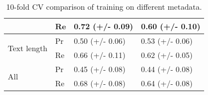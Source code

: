 \documentclass[11pt,a4paper]{article}
\begin{document}
\begin{table}[]
\begin{center}
\begin{tabular}{|l|l|l|l|}
                                                                                   & Re & 0.72 (+/- 0.09) & 0.60 (+/- 0.10) \\ \hline
\multirow{2}{*}{Text length}                                                       & Pr & 0.50 (+/- 0.06) & 0.53 (+/- 0.06) \\ \cline{2-4} 
                                                                                   & Re & 0.66 (+/- 0.11) & 0.62 (+/- 0.05) \\ \hline
\multirow{2}{*}{All}                                                               & Pr & 0.45 (+/- 0.08) & 0.44 (+/- 0.08) \\ \cline{2-4} 
                                                                                   & Re & 0.68 (+/- 0.08) & 0.64 (+/- 0.08) \\ \hline
\end{tabular}
\end{center}
\caption{\label{tab:metadata}10-fold CV comparison of training on different metadata.}
\end{table}





\end{document}

